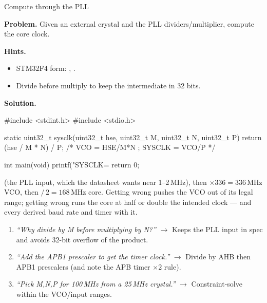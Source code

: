 \begin{gymproblem}{Compute  through the PLL}

\textbf{Problem.} Given an external crystal and the PLL dividers/multiplier,
compute the core clock.

\textbf{Hints.}
\begin{itemize}
\item STM32F4 form: , .
\item Divide before multiply to keep the intermediate in 32 bits.
\end{itemize}

\attempt

\textbf{Solution.}
\begin{cgym}
#include <stdint.h>
#include <stdio.h>

static uint32_t sysclk(uint32_t hse, uint32_t M, uint32_t N, uint32_t P) {
    return (hse / M * N) / P;     /* VCO = HSE/M*N ; SYSCLK = VCO/P */
}

int main(void) {
    printf("SYSCLK=%
    return 0;
}
\end{cgym}

 (the PLL input, which the datasheet wants near
1--2\,MHz), then $\times 336 = 336$\,MHz VCO, then $/\,2 = 168$\,MHz core. Getting
 wrong pushes the VCO out of its legal range; getting  wrong
runs the core at half or double the intended clock --- and every derived baud
rate and timer with it.

\followups
\begin{enumerate}
\item \emph{``Why divide by M \emph{before} multiplying by N?''} $\rightarrow$
  Keeps the PLL input in spec and avoids 32-bit overflow of the product.
\item \emph{``Add the APB1 prescaler to get the timer clock.''} $\rightarrow$
  Divide  by AHB then APB1 prescalers (and note the APB timer
  $\times2$ rule).
\item \emph{``Pick M,N,P for 100\,MHz from a 25\,MHz crystal.''} $\rightarrow$
  Constraint-solve within the VCO/input ranges.
\end{enumerate}
\end{gymproblem}

